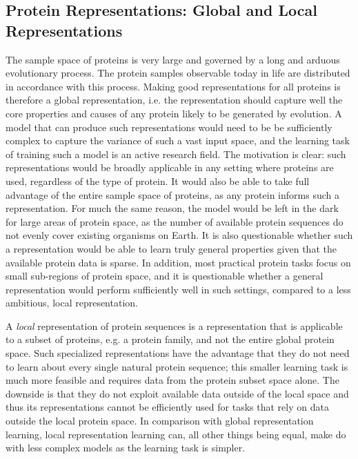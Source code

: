 \subsection{Protein Representations: Global and Local Representations}
\label{sec:global_local_representations}
The sample space of proteins is very large and governed by a long and arduous evolutionary process. The protein samples observable today in life are distributed in accordance with this process. Making good representations for all proteins is therefore a global representation, i.e. the representation should capture well the core properties and causes of any protein likely to be generated by evolution. A model that can produce such representations would need to be be sufficiently complex to capture the variance of such a vast input space, and the learning task of training such a model is an active research field. The motivation is clear: such representations would be broadly applicable in any setting where proteins are used, regardless of the type of protein. It would also be able to take full advantage of the entire sample space of proteins, as any protein informs such a representation. For much the same reason, the model would be left in the dark for large areas of protein space, as the number of available protein sequences do not evenly cover existing organisms on Earth. It is also questionable whether such a representation would be able to learn truly general properties given that the available protein data is sparse. In addition, most practical protein tasks focus on small sub-regions of protein space, and it is questionable whether a general representation would perform sufficiently well in such settings, compared to a less ambitious, local representation. 

A \textit{local} representation of protein sequences is a representation that is applicable to a subset of proteins, e.g. a protein family, and not the entire global protein space. Such specialized representations have the advantage that they do not need to learn about every single natural protein sequence; this smaller learning task is much more feasible and requires data from the protein subset space alone. The downside is that they do not exploit available data outside of the local space and thus its representations cannot be efficiently used for tasks that rely on data outside the local protein space. In comparison with global representation learning, local representation learning can, all other things being equal, make do with less complex models as the learning task is simpler.


